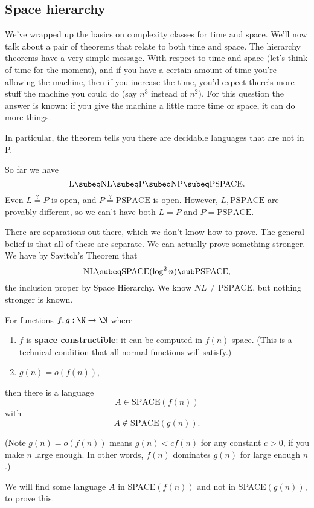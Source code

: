 \subsection{Space hierarchy}
We've wrapped up the basics on complexity classes for time and space. We'll now talk about a pair of theorems that relate to both time and space. The hierarchy theorems have a very simple message. With respect to time and space (let's think of time for the moment), and if you have a certain amount of time you're allowing the machine, then if you increase the time, you'd expect there's more stuff the machine you could do (say $n^3$ instead of $n^2$). For this question the answer is known: if you give the machine a little more time or space, it can do more things. 

In particular, the theorem tells you there are decidable languages that are not in P.

So far we have
\[
\text{L}\subeq \text{NL}\subeq \text{P}\subeq \text{NP}\subeq \text{PSPACE}.
\]
Even $L\stackrel ?= P$ is open, and $P\stackrel ?=\text{PSPACE}$ is open. However, $L, \text{PSPACE}$ are provably different, so we can't have both $L=P$ and $P=\text{PSPACE}$.

There are separations out there, which we don't know how to prove. The general belief is that all of these are separate. We can actually prove something stronger. We have by Savitch's Theorem that
\[
\text{NL}\subeq \text{SPACE}(\log^2 n)\sub \text{PSPACE},
\]
the inclusion proper by Space Hierarchy. We know $NL\ne \text{PSPACE}$, but nothing stronger is known.

\begin{thm}
For functions $f,g:\N\to \N$ where 
\begin{enumerate}
\item
$f$ is \textbf{space constructible}: it can be computed in $f(n)$ space. (This is a technical condition that all normal functions will satisfy.)
\item
$g(n)=o(f(n))$,
\end{enumerate}
then there is a language
\[
A\in \text{SPACE}(f(n))
\]
with 
\[
A\nin \text{SPACE}(g(n)).
\]
\end{thm} 
(Note $g(n)=o(f(n))$ means $g(n)<cf(n)$ for any constant $c>0$, if you make $n$ large enough. In other words, $f(n)$ dominates $g(n)$ for large enough $n$.)

We will find some language $A$ in SPACE$(f(n))$ and not in SPACE$(g(n))$, to prove this.

